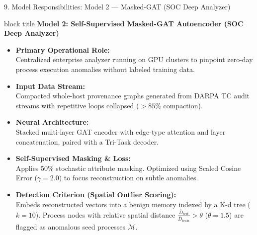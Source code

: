 \documentclass[aspectratio=169,10pt]{beamer}
\begin{document}
\begin{frame}{9. Model Responsibilities: Model 2 — Masked-GAT (SOC Deep Analyzer)}
\vspace{0.15em}
\begin{beamercolorbox}[rounded=true,shadow=false,sep=0.35em,wd=\textwidth]{block title}
\textbf{\scriptsize Model 2: Self-Supervised Masked-GAT Autoencoder (SOC Deep Analyzer)}
\end{beamercolorbox}
\vspace{0.15em}
{\fontsize{7.5pt}{10.5pt}\selectfont
\begin{itemize}\itemsep0.22em
  \item \textbf{Primary Operational Role:}\\
  Centralized enterprise analyzer running on GPU clusters to pinpoint zero-day process execution anomalies without labeled training data.
  \item \textbf{Input Data Stream:}\\
  Compacted whole-host provenance graphs generated from DARPA TC audit streams with repetitive loops collapsed ($>85\%$ compaction).
  \item \textbf{Neural Architecture:}\\
  Stacked multi-layer GAT encoder with edge-type attention and layer concatenation, paired with a Tri-Task decoder.
  \item \textbf{Self-Supervised Masking \& Loss:}\\
  Applies 50\% stochastic attribute masking. Optimized using Scaled Cosine Error ($\gamma=2.0$) to focus reconstruction on subtle anomalies.
  \item \textbf{Detection Criterion (Spatial Outlier Scoring):}\\
  Embeds reconstructed vectors into a benign memory indexed by a K-d tree ($k=10$). Process nodes with relative spatial distance $\frac{\bar{D}_{\text{test}}}{\bar{D}_{\text{train}}} > \theta$ ($\theta=1.5$) are flagged as anomalous seed processes $\mathcal{M}$.
\end{itemize}
}
\end{frame}
\end{document}
